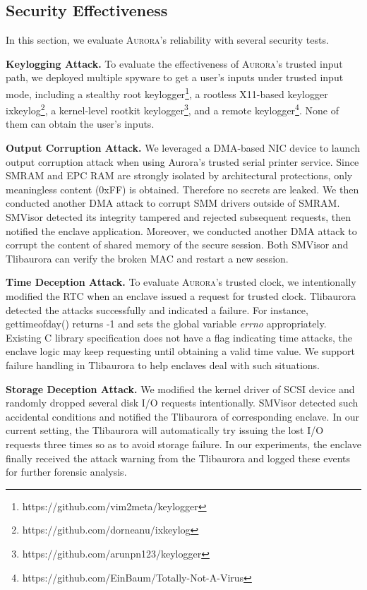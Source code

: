 \subsection{Security Effectiveness}\label{security}
In this section, we evaluate \textsc{Aurora}'s reliability with several security tests.

\textbf{Keylogging Attack.}
To evaluate the effectiveness of \textsc{Aurora}'s trusted input path, we deployed multiple spyware to get a user's inputs under trusted input mode, including a stealthy root keylogger\footnote{https://github.com/vim2meta/keylogger}, a rootless X11-based keylogger ixkeylog\footnote{https://github.com/dorneanu/ixkeylog}, 
a kernel-level rootkit  keylogger\footnote{https://github.com/arunpn123/keylogger}, 
and a remote keylogger\footnote{https://github.com/EinBaum/Totally-Not-A-Virus}. None of them can obtain the user's inputs.

\textbf{Output Corruption Attack.}
We leveraged a DMA-based NIC device to launch output corruption attack when using Aurora's trusted serial printer service. Since  SMRAM and EPC RAM are strongly isolated by architectural protections, only meaningless content (0xFF) is obtained. Therefore no secrets are leaked. We then conducted another DMA attack to corrupt SMM drivers outside of SMRAM. SMVisor detected its integrity tampered  and rejected subsequent requests, then notified the enclave application. Moreover, we conducted another DMA attack to corrupt the content of shared memory of the secure session. Both SMVisor and Tlibaurora can verify the broken MAC and restart a new session.

\textbf{Time Deception Attack.}
To evaluate \textsc{Aurora}’s trusted clock, we intentionally modified the RTC when an enclave issued a request for trusted clock. Tlibaurora detected the attacks successfully and indicated a failure. For instance, gettimeofday() returns -1 and sets the global variable \textit{errno} appropriately. Existing C library specification does not have a flag indicating time attacks, the enclave logic may keep requesting until obtaining a valid time value. We support failure handling in Tlibaurora to help enclaves deal with such situations.

\textbf{Storage Deception Attack.}
We modified the kernel driver of SCSI device and randomly dropped several disk I/O requests intentionally.  SMVisor detected such accidental conditions and notified the Tlibaurora of corresponding enclave. In our current setting, the Tlibaurora will automatically try issuing the lost I/O requests three times so as to avoid storage failure. In our experiments, the enclave finally received the attack warning from the Tlibaurora and logged these events for further forensic analysis.

